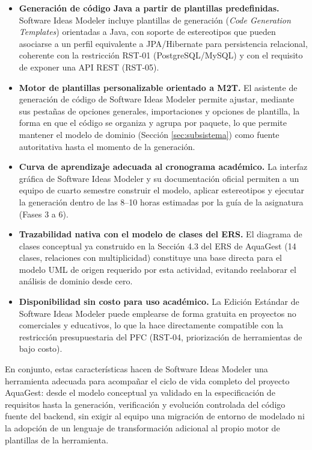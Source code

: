 \documentclass[11pt,a4paper]{article}
\begin{document}
\begin{itemize}[leftmargin=1.4em]
    \item \textbf{Generación de código Java a partir de plantillas predefinidas.} Software Ideas Modeler incluye plantillas de generación (\emph{Code Generation Templates}) orientadas a Java, con soporte de estereotipos que pueden asociarse a un perfil equivalente a JPA/Hibernate para persistencia relacional, coherente con la restricción RST-01 (PostgreSQL/MySQL) y con el requisito de exponer una API REST (RST-05).
    \item \textbf{Motor de plantillas personalizable orientado a M2T.} El asistente de generación de código de Software Ideas Modeler permite ajustar, mediante sus pestañas de opciones generales, importaciones y opciones de plantilla, la forma en que el código se organiza y agrupa por paquete, lo que permite mantener el modelo de dominio (Sección \ref{sec:subsistema}) como fuente autoritativa hasta el momento de la generación.
    \item \textbf{Curva de aprendizaje adecuada al cronograma académico.} La interfaz gráfica de Software Ideas Modeler y su documentación oficial permiten a un equipo de cuarto semestre construir el modelo, aplicar estereotipos y ejecutar la generación dentro de las 8--10 horas estimadas por la guía de la asignatura (Fases 3 a 6).
    \item \textbf{Trazabilidad nativa con el modelo de clases del ERS.} El diagrama de clases conceptual ya construido en la Sección 4.3 del ERS de AquaGest (14 clases, relaciones con multiplicidad) constituye una base directa para el modelo UML de origen requerido por esta actividad, evitando reelaborar el análisis de dominio desde cero.
    \item \textbf{Disponibilidad sin costo para uso académico.} La Edición Estándar de Software Ideas Modeler puede emplearse de forma gratuita en proyectos no comerciales y educativos, lo que la hace directamente compatible con la restricción presupuestaria del PFC (RST-04, priorización de herramientas de bajo costo).
\end{itemize}

En conjunto, estas características hacen de Software Ideas Modeler una herramienta adecuada para acompañar el ciclo de vida completo del proyecto AquaGest: desde el modelo conceptual ya validado en la especificación de requisitos hasta la generación, verificación y evolución controlada del código fuente del backend, sin exigir al equipo una migración de entorno de modelado ni la adopción de un lenguaje de transformación adicional al propio motor de plantillas de la herramienta.
\end{document}
